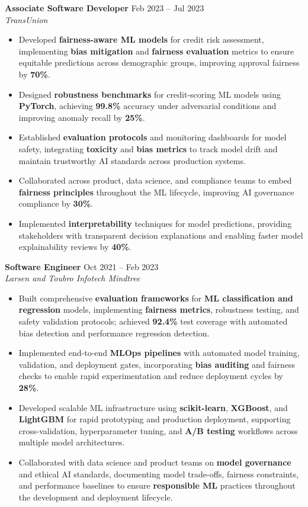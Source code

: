 \documentclass[11pt,a4paper]{article}
\newcommand{\jobentry}[3]{%
  \vspace{5pt}%
  \noindent\textbf{#1} \hfill #3\\%
  \textit{#2}%
}
\begin{document}
\jobentry{Associate Software Developer}{TransUnion}{Feb 2023 -- Jul 2023}
\begin{itemize}
\item Developed \textbf{fairness-aware ML models} for credit risk assessment, implementing \textbf{bias mitigation} and \textbf{fairness evaluation} metrics to ensure equitable predictions across demographic groups, improving approval fairness by \textbf{70\%}.
\item Designed \textbf{robustness benchmarks} for credit-scoring ML models using \textbf{PyTorch}, achieving \textbf{99.8\%} accuracy under adversarial conditions and improving anomaly recall by \textbf{25\%}.
\item Established \textbf{evaluation protocols} and monitoring dashboards for model safety, integrating \textbf{toxicity} and \textbf{bias metrics} to track model drift and maintain trustworthy AI standards across production systems.
\item Collaborated across product, data science, and compliance teams to embed \textbf{fairness principles} throughout the ML lifecycle, improving AI governance compliance by \textbf{30\%}.
\item Implemented \textbf{interpretability} techniques for model predictions, providing stakeholders with transparent decision explanations and enabling faster model explainability reviews by \textbf{40\%}.
\end{itemize}

\jobentry{Software Engineer}{Larsen and Toubro Infotech Mindtree}{Oct 2021 -- Feb 2023}
\begin{itemize}
\item Built comprehensive \textbf{evaluation frameworks} for \textbf{ML classification and regression} models, implementing \textbf{fairness metrics}, robustness testing, and safety validation protocols; achieved \textbf{92.4\%} test coverage with automated bias detection and performance regression detection.
\item Implemented end-to-end \textbf{MLOps pipelines} with automated model training, validation, and deployment gates, incorporating \textbf{bias auditing} and fairness checks to enable rapid experimentation and reduce deployment cycles by \textbf{28\%}.
\item Developed scalable ML infrastructure using \textbf{scikit-learn}, \textbf{XGBoost}, and \textbf{LightGBM} for rapid prototyping and production deployment, supporting cross-validation, hyperparameter tuning, and \textbf{A/B testing} workflows across multiple model architectures.
\item Collaborated with data science and product teams on \textbf{model governance} and ethical AI standards, documenting model trade-offs, fairness constraints, and performance baselines to ensure \textbf{responsible ML} practices throughout the development and deployment lifecycle.
\end{itemize}
\end{document}
